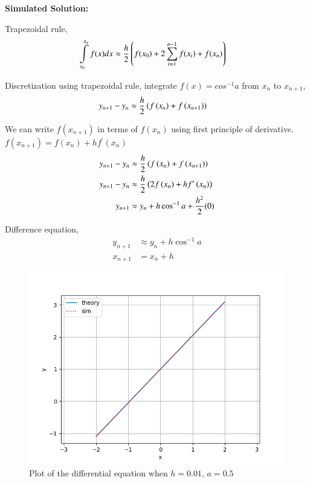 \documentclass[journal]{IEEEtran}
\begin{document}
\medskip

\textbf{Simulated Solution:}

Trapezoidal rule,
\begin{align}
    \int\limits_{x_0}^{x_n}f(x)dx &\approx \frac{h}{2} \left(f(x_{0}) + 2 \sum_{i=1}^{n-1} f(x_{i}) + f(x_{n}) \right)
\end{align}

Discretization using trapezoidal rule, integrate $f(x)=cos^{-1}a$ from $x_{n}$ to $x_{n+1}$,
\begin{align}
    y_{n+1}-y_{n} &\approx \frac{h}{2}\left(f\left(x_{n}\right)+f\left(x_{n+1}\right)\right)
\end{align}
    
We can write $f(x_{n+1})$ in terms of $f(x_n)$ using first principle of derivative. $f(x_{n+1})=f(x_n)+hf^{\prime}(x_n)$
\begin{align}
	y_{n+1}-y_{n} &\approx \frac{h}{2}\left(f\left(x_{n}\right)+f\left(x_{n+1}\right)\right) \\
	y_{n+1}-y_{n} &\approx \frac{h}{2}\left(2f\left(x_{n}\right)+hf^\prime\left(x_{n}\right)\right) \\
    y_{n+1} &\approx y_{n} + h\cos^{-1}a + \frac{h^2}{2}(0)
\end{align}

Difference equation,
\begin{align}
    y_{n+1} &\approx y_{n} + h\cos^{-1}a \\
    x_{n+1} &= x_n + h
\end{align}

\begin{figure}[h]
    \centering
    \includegraphics[width=\columnwidth]{figs/plot.png}
    \caption{Plot of the differential equation when $h=0.01$, $a=0.5$}
    \label{fig:Plot1}
    \end{figure}
\end{document}
